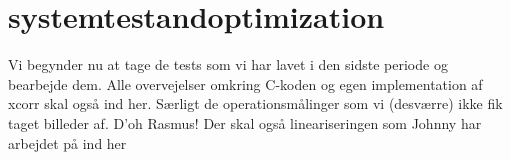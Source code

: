 \chapter{systemtestandoptimization}
Vi begynder nu at tage de tests som vi har lavet i den sidste periode og bearbejde dem. Alle overvejelser omkring C-koden og egen implementation af xcorr skal også ind her. Særligt de operationsmålinger som vi (desværre) ikke fik taget billeder af. D'oh Rasmus! Der skal også lineariseringen som Johnny har arbejdet på ind her